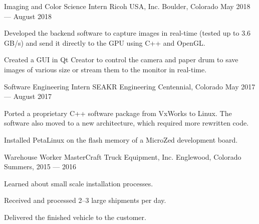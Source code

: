 \begin{cventries}
  \cventry%
    {Imaging and Color Science Intern}
    {Ricoh USA, Inc.}
    {Boulder, Colorado}
    {May 2018 --- August 2018}
    {%
      \begin{cvitems}
         \item Developed the backend software to capture images in real-time
               (tested up to 3.6 GB/s) and send it directly to the GPU using C++
               and OpenGL.\@
         \item Created a GUI in Qt Creator to control the camera and paper drum to save
               images of various size or stream them to the monitor in real-time.
      \end{cvitems}
    }
  \cventry%
    {Software Engineering Intern}
    {SEAKR Engineering}
    {Centennial, Colorado}
    {May 2017 --- August 2017}
    {%
      \begin{cvitems}
         \item Ported a proprietary C++ software package from VxWorks to Linux.
         The software also moved to a new architecture, which required more
         rewritten code.
         \item Installed PetaLinux on the flash memory of a MicroZed development board.
      \end{cvitems}
    }
  \cventry%
    {Warehouse Worker}
    {MasterCraft Truck Equipment, Inc.}
    {Englewood, Colorado}
    {Summers, 2015 --- 2016}
    {%
      \begin{cvitems}
         \item Learned about small scale installation processes.
         \item Received and processed 2--3 large shipments per day.
         \item Delivered the finished vehicle to the customer.
      \end{cvitems}
    }
\end{cventries}
